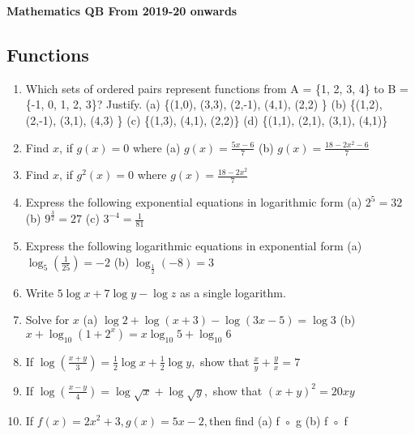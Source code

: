 \documentclass[14pt]{article}
\begin{document}
\centering 
{\huge \bf Mathematics QB From 2019-20 onwards\par}
\vspace{1cm}
\begin{multicols}{2}

\section{Functions}
\noindent
\begin{enumerate}[resume]


 \item  Which sets of ordered pairs represent
functions from A = \{1, 2, 3, 4\} to B = \{-1, 0,
1, 2, 3\}? Justify. 
	 (a)	 \{(1,0), (3,3), (2,-1), (4,1), (2,2) \}    
	 (b) 	\{(1,2), (2,-1), (3,1), (4,3) \}   	 (c) 	\{(1,3), (4,1), (2,2)\}	 (d) 	\{(1,1), (2,1), (3,1), (4,1)\}
 
 \item Find $x$, if $g (x) = 0$ where  (a) $g(x)=\frac{5x-6}{7}$ (b) $g(x)=\frac{18-2x^2-6}{7}$ 
 
 \item Find $x$, if $g^2 (x) = 0$ where  $g(x)=\frac{18-2x^2}{7}$ 
 

\item Express the following exponential equations
in logarithmic form  (a) $2^5=32$ (b) $9^\frac{3}{2}=27$ (c) $3^{-4} = \frac{1}{81}$

\item Express the following logarithmic equations 	
in exponential form (a) $\log_5\left( \frac{1}{25}\right)=-2$ (b) $\log_\frac{1}{2}(-8)=3$ 

\item Write $5\log x + 7\log y -\log z$ as a single
logarithm.

\item Solve for $x$ (a) $\log2 +\log(x+3) -\log(3x-5) =\log3$ (b) $x +\log_{10} (1+2^x ) = x\log_{10} 5 +\log_{ 10}6$

\item If  $\log\left(\frac{x+y}{3}\right)=\frac{1}{2}\log x+ \frac{1}{2}\log y, $ show that $\frac{x}{y}+\frac{y}{x}=7$

\item If  $\log\left(\frac{x-y}{4}\right)= \log \sqrt{x}+ \log \sqrt{y}, $ show that $(x+y)^2=20xy$

\item If  $f (x) = 2x^2 + 3, g (x) = 5x - 2, $then find
	(a) f ◦ g
	(b) f ◦ f	


\end{enumerate}
\end{multicols}
\end{document}
